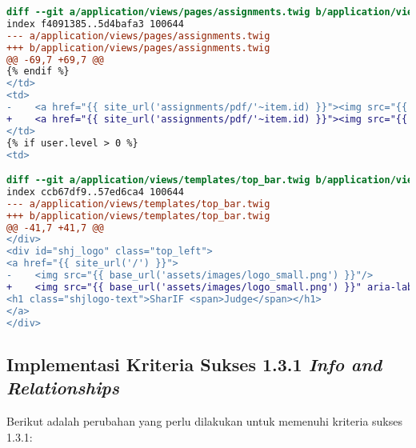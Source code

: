 \begin{itemize}
\begin{lstlisting}[language=diff, caption=Perubahan untuk mematuhi kriteria 1.1.1, label=lst_1.1.1, basicstyle=\ttfamily, frame=single,
columns=fullflexible, keepspaces=true, breaklines=true]
diff --git a/application/views/pages/assignments.twig b/application/views/pages/assignments.twig
index f4091385..5d4bafa3 100644
--- a/application/views/pages/assignments.twig
+++ b/application/views/pages/assignments.twig
@@ -69,7 +69,7 @@
{% endif %}
</td>
<td>
-    <a href="{{ site_url('assignments/pdf/'~item.id) }}"><img src="{{ base_url('assets/images/pdf.svg') }}" /></a>
+    <a href="{{ site_url('assignments/pdf/'~item.id) }}"><img src="{{ base_url('assets/images/pdf.svg') }}" aria-label="Download PDF For Assignment {{ item.name }}"/></a>
</td>
{% if user.level > 0 %}
<td>

diff --git a/application/views/templates/top_bar.twig b/application/views/templates/top_bar.twig
index ccb67df9..57ed6ca4 100644
--- a/application/views/templates/top_bar.twig
+++ b/application/views/templates/top_bar.twig
@@ -41,7 +41,7 @@
</div>
<div id="shj_logo" class="top_left">
<a href="{{ site_url('/') }}">
-    <img src="{{ base_url('assets/images/logo_small.png') }}"/>
+    <img src="{{ base_url('assets/images/logo_small.png') }}" aria-label="Logo SharIF Judge"/>
<h1 class="shjlogo-text">SharIF <span>Judge</span></h1>
</a>
</div>
\end{lstlisting}

\end{itemize}

\subsection{Implementasi Kriteria Sukses 1.3.1 \textit{Info and Relationships}}
\label{subsec:implementasi_A_1.3.1}

Berikut adalah perubahan yang perlu dilakukan untuk memenuhi kriteria sukses 1.3.1:

